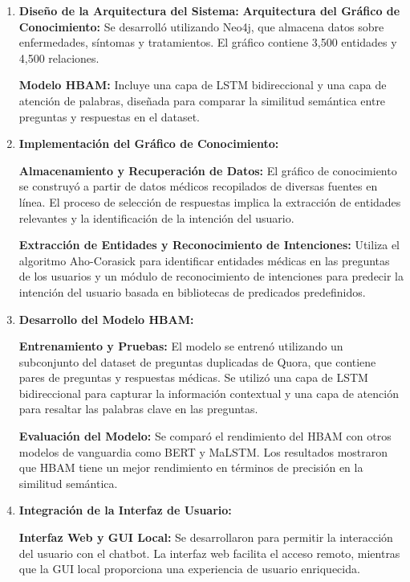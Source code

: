 	\begin{enumerate}
	
		\item \textbf{Diseño de la Arquitectura del Sistema:}
			\subitem \textbf{Arquitectura del Gráfico de Conocimiento:} Se desarrolló utilizando Neo4j, que almacena datos sobre enfermedades, síntomas y tratamientos. El gráfico contiene 3,500 entidades y 4,500 relaciones.
		
			\subitem \textbf{Modelo HBAM:} Incluye una capa de LSTM bidireccional y una capa de atención de palabras, diseñada para comparar la similitud semántica entre preguntas y respuestas en el dataset.
		
		\item \textbf{Implementación del Gráfico de Conocimiento:}
		
			\subitem \textbf{Almacenamiento y Recuperación de Datos:} El gráfico de conocimiento se construyó a partir de datos médicos recopilados de diversas fuentes en línea. El proceso de selección de respuestas implica la extracción de entidades relevantes y la identificación de la intención del usuario.
		
			\subitem \textbf{Extracción de Entidades y Reconocimiento de Intenciones:} Utiliza el algoritmo Aho-Corasick para identificar entidades médicas en las preguntas de los usuarios y un módulo de reconocimiento de intenciones para predecir la intención del usuario basada en bibliotecas de predicados predefinidos.
		
		\item \textbf{Desarrollo del Modelo HBAM:}
		
			\subitem \textbf{Entrenamiento y Pruebas:} El modelo se entrenó utilizando un subconjunto del dataset de preguntas duplicadas de Quora, que contiene pares de preguntas y respuestas médicas. Se utilizó una capa de LSTM bidireccional para capturar la información contextual y una capa de atención para resaltar las palabras clave en las preguntas.
	
			\subitem \textbf{Evaluación del Modelo:} Se comparó el rendimiento del HBAM con otros modelos de vanguardia como BERT y MaLSTM. Los resultados mostraron que HBAM tiene un mejor rendimiento en términos de precisión en la similitud semántica.
		
		\item \textbf{Integración de la Interfaz de Usuario:}
		
			\subitem \textbf{Interfaz Web y GUI Local:} Se desarrollaron para permitir la interacción del usuario con el chatbot. La interfaz web facilita el acceso remoto, mientras que la GUI local proporciona una experiencia de usuario enriquecida.
		

\end{enumerate}
